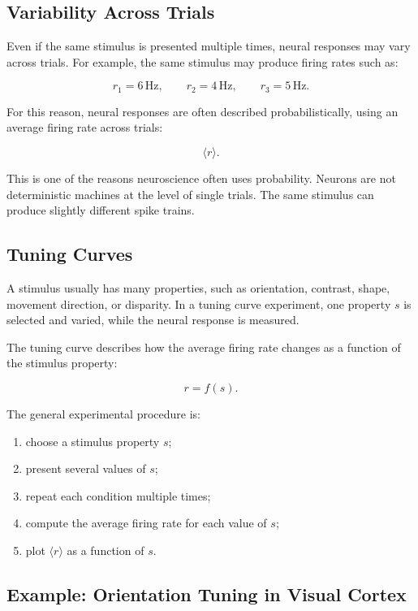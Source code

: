 \subsection{Variability Across Trials}

Even if the same stimulus is presented multiple times, neural responses may vary across trials. For example, the same stimulus may produce firing rates such as:

\[
r_1 = 6\,\text{Hz},
\qquad
r_2 = 4\,\text{Hz},
\qquad
r_3 = 5\,\text{Hz}.
\]

For this reason, neural responses are often described probabilistically, using an average firing rate across trials:

\[
\langle r \rangle.
\]

\begin{authornote}
This is one of the reasons neuroscience often uses probability. Neurons are not deterministic machines at the level of single trials. The same stimulus can produce slightly different spike trains.
\end{authornote}

\subsection{Tuning Curves}

A stimulus usually has many properties, such as orientation, contrast, shape, movement direction, or disparity. In a tuning curve experiment, one property $s$ is selected and varied, while the neural response is measured.

The tuning curve describes how the average firing rate changes as a function of the stimulus property:

\[
r = f(s).
\]

The general experimental procedure is:

\begin{enumerate}[noitemsep]
    \item choose a stimulus property $s$;
    \item present several values of $s$;
    \item repeat each condition multiple times;
    \item compute the average firing rate for each value of $s$;
    \item plot $\langle r \rangle$ as a function of $s$.
\end{enumerate}

\subsection{Example: Orientation Tuning in Visual Cortex}


